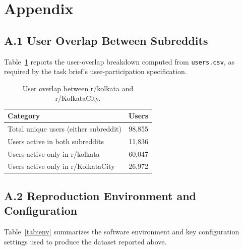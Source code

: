 \documentclass[12pt]{article}
\begin{document}
\section{Appendix}

\subsection*{A.1 User Overlap Between Subreddits}
Table~\ref{tab:overlap} reports the user-overlap breakdown computed from \texttt{users.csv},
as required by the task brief's user-participation specification.

\begin{table}[h]
\centering
\small
\caption{User overlap between r/kolkata and r/KolkataCity.}
\label{tab:overlap}
\begin{tabular}{lr}
\toprule
\textbf{Category} & \textbf{Users} \\
\midrule
Total unique users (either subreddit) & 98{,}855 \\
Users active in both subreddits & 11{,}836 \\
Users active only in r/kolkata & 60{,}047 \\
Users active only in r/KolkataCity & 26{,}972 \\
\bottomrule
\end{tabular}
\end{table}

\subsection*{A.2 Reproduction Environment and Configuration}
Table~\ref{tab:env} summarizes the software environment and key configuration settings used to
produce the dataset reported above.
\end{document}
